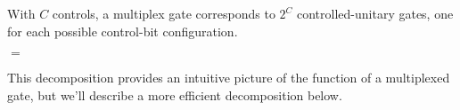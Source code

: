 With $C$ controls, a multiplex gate corresponds to $2^C$ controlled-unitary gates, one for each possible control-bit configuration.
\begin{center}
$=$
\end{center}
This decomposition provides an intuitive picture of the function of a multiplexed gate, but we'll describe a more efficient decomposition below.







